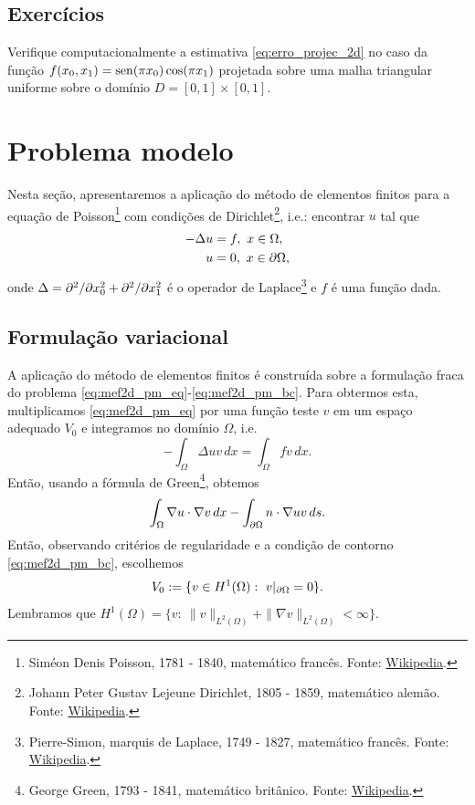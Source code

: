\subsection{Exercícios}
\badgeRevisar

\begin{exer}
  Verifique computacionalmente a estimativa \eqref{eq:erro_projec_2d} no caso da função $f(x_0,x_1) = \operatorname{sen}(\pi x_0)\cos(\pi x_1)$ projetada sobre uma malha triangular uniforme sobre o domínio $D = [0, 1]\times [0, 1]$.
\end{exer}

\section{Problema modelo}\label{cap_mef2d_sec_probmodelo}
\badgeRevisar

Nesta seção, apresentaremos a aplicação do método de elementos finitos para a equação de Poisson\footnote{Siméon Denis Poisson, 1781 - 1840, matemático francês. Fonte: \href{https://en.wikipedia.org/wiki/Sim\%C3\%A9on_Denis_Poisson}{Wikipedia}.} com condições de Dirichlet\footnote{Johann Peter Gustav Lejeune Dirichlet, 1805 - 1859, matemático alemão. Fonte: \href{https://en.wikipedia.org/wiki/Peter_Gustav_Lejeune_Dirichlet}{Wikipedia}.}, i.e.: encontrar $u$ tal que
\begin{align}
  -\Delta u &= f,~x\in\Omega,\label{eq:mef2d_pm_eq}\\
  u &= 0,~x\in\partial\Omega,\label{eq:mef2d_pm_bc}
\end{align}
onde $\Delta = \partial^2/\partial x_0^2 + \partial^2/\partial x_1^2$ é o operador de Laplace\footnote{Pierre-Simon, marquis de Laplace, 1749 - 1827, matemático francês. Fonte: \href{https://en.wikipedia.org/wiki/Pierre-Simon_Laplace}{Wikipedia}.} e $f$ é uma função dada.

\subsection{Formulação variacional}
\badgeRevisar

A aplicação do método de elementos finitos é construída sobre a formulação fraca do problema \eqref{eq:mef2d_pm_eq}-\eqref{eq:mef2d_pm_bc}. Para obtermos esta, multiplicamos \eqref{eq:mef2d_pm_eq} por uma função teste $v$ em um espaço adequado $V_0$ e integramos no domínio $\Omega$, i.e.
\begin{equation}
  - \int_\Omega \Delta uv\,dx = \int_\Omega fv\,dx.
\end{equation}
Então, usando a fórmula de Green\footnote{George Green, 1793 - 1841, matemático britânico. Fonte: \href{https://en.wikipedia.org/wiki/George_Green_(mathematician)}{Wikipedia}.}, obtemos
\begin{equation}
  \int_\Omega \nabla u\cdot\nabla v\,dx - \int_{\partial\Omega} n\cdot\nabla uv\,ds.
\end{equation}
Então, observando critérios de regularidade e a condição de contorno \eqref{eq:mef2d_pm_bc}, escolhemos
\begin{equation}
  V_0 := \{v\in H^1(\Omega):~v|_{\partial\Omega}=0\}.
\end{equation}
Lembramos que $H^1(\Omega) = \{v:~\|v\|_{L^2(\Omega)}+\|\nabla v\|_{L^2(\Omega)}<\infty\}$.

